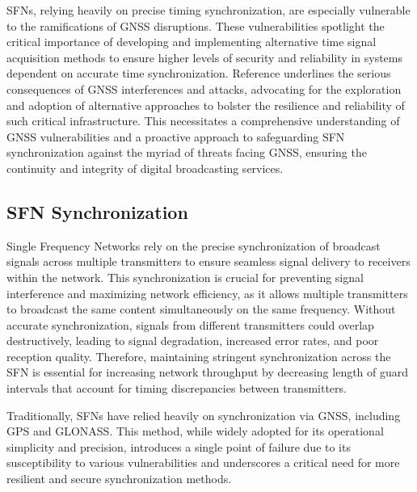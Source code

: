 \documentclass[conference]{IEEEtran}
\begin{document}
SFNs, relying heavily on precise timing synchronization, are especially
vulnerable to the ramifications of GNSS disruptions. These vulnerabilities
spotlight the critical importance of developing and implementing alternative
time signal acquisition methods to ensure higher levels of security and
reliability in systems dependent on accurate time synchronization. Reference
\cite{machaj2021impact} underlines the serious consequences of GNSS
interferences and attacks, advocating for the exploration and adoption of
alternative approaches to bolster the resilience and reliability of such
critical infrastructure. This necessitates a comprehensive understanding of
GNSS vulnerabilities and a proactive approach to safeguarding SFN
synchronization against the myriad of threats facing GNSS, ensuring the
continuity and integrity of digital broadcasting services.

\subsection{SFN Synchronization}\label{sfn-sync}

Single Frequency Networks rely on the precise synchronization of
broadcast signals across multiple transmitters to ensure seamless signal
delivery to receivers within the network. This synchronization is crucial for
preventing signal interference and maximizing network efficiency, as it allows
multiple transmitters to broadcast the same content simultaneously on the same
frequency. Without accurate synchronization, signals from different
transmitters could overlap destructively, leading to signal degradation,
increased error rates, and poor reception quality. Therefore, maintaining
stringent synchronization across the SFN is essential for increasing network
throughput by decreasing length of guard intervals that account for timing
discrepancies between transmitters.

Traditionally, SFNs have relied heavily on synchronization via GNSS, including GPS and GLONASS. This method,
while widely adopted for its operational simplicity and precision, introduces a
single point of failure due to its susceptibility to various vulnerabilities
and underscores a critical need for more resilient and secure synchronization
methods.
\end{document}
